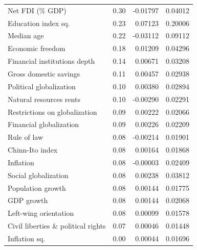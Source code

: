\documentclass[preprint, nonatbib, 10pt]{elsarticle}
\begin{document}
\begin{table}[ht!]
\begin{tabular}{lrrr}
    Net FDI (\% GDP) & 0.30 & -0.01797 & 0.04012 \\ 
    Education index sq. & 0.23 & 0.07123 & 0.20006 \\ 
    Median age & 0.22 & -0.03112 & 0.09112 \\ 
    Economic freedom & 0.18 & 0.01209 & 0.04296 \\ 
    Financial institutions depth & 0.14 & 0.00671 & 0.03208 \\ 
    Gross domestic savings & 0.11 & 0.00457 & 0.02938 \\ 
    Political globalization & 0.10 & 0.00380 & 0.02894 \\
    Natural resources rents & 0.10 & -0.00290 & 0.02291 \\ 
    Restrictions on globalization & 0.09 & 0.00222 & 0.02066 \\ 
    Financial globalization & 0.09 & 0.00226 & 0.02209 \\
    Rule of law & 0.08 & -0.00214 & 0.01901 \\ 
    Chinn-Ito index & 0.08 & 0.00164 & 0.01868 \\
    Inflation & 0.08 & -0.00003 & 0.02409 \\ 
    Social globalization & 0.08 & 0.00238 & 0.03812 \\
    Population growth & 0.08 & 0.00144 & 0.01775 \\
    GDP growth & 0.08 & 0.00144 & 0.02068 \\
    Left-wing orientation & 0.08 & 0.00099 & 0.01578 \\ 
    Civil liberties \& political rights & 0.07 & 0.00046 & 0.01448 \\
    Inflation sq. & 0.00 & 0.00044 & 0.01696 \\ 
    \bottomrule
  \end{tabular}
  \end{table}
  
\end{document}

